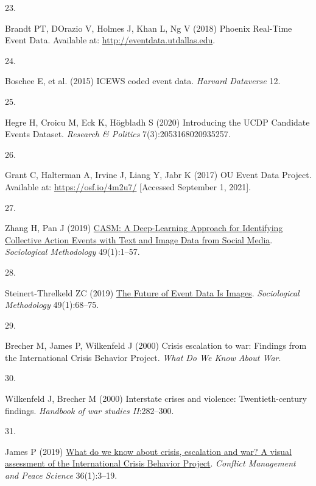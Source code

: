 \documentclass{article}
\newlength{\cslhangindent}
\newlength{\csllabelwidth}
\newlength{\cslentryspacingunit} %
\newenvironment{CSLReferences}[2] %
 {%
  \setlength{\parindent}{0pt}
  \ifodd #1
  \let\oldpar\par
  \def\par{\hangindent=\cslhangindent\oldpar}
  \fi
  \setlength{\parskip}{#2\cslentryspacingunit}
 }%
 {}
\newcommand{\CSLLeftMargin}[1]{\parbox[t]{\csllabelwidth}{#1}}
\newcommand{\CSLRightInline}[1]{\parbox[t]{\linewidth - \csllabelwidth}{#1}\break}
\begin{document}
\begin{CSLReferences}{0}{0}
\leavevmode{}%
\CSLLeftMargin{23. }%
\CSLRightInline{Brandt PT, DOrazio V, Holmes J, Khan L, Ng V (2018)
Phoenix {Real-Time Event Data}. Available at:
\url{http://eventdata.utdallas.edu}.}

\leavevmode{}%
\CSLLeftMargin{24. }%
\CSLRightInline{Boschee E, et al. (2015) {ICEWS} coded event data.
\emph{Harvard Dataverse} 12.}

\leavevmode{}%
\CSLLeftMargin{25. }%
\CSLRightInline{Hegre H, Croicu M, Eck K, Högbladh S (2020) Introducing
the {UCDP Candidate Events Dataset}. \emph{Research \& Politics}
7(3):2053168020935257.}

\leavevmode{}%
\CSLLeftMargin{26. }%
\CSLRightInline{Grant C, Halterman A, Irvine J, Liang Y, Jabr K (2017)
{OU Event Data Project}. Available at: \url{https://osf.io/4m2u7/}
{[}Accessed September 1, 2021{]}.}

\leavevmode{}%
\CSLLeftMargin{27. }%
\CSLRightInline{Zhang H, Pan J (2019)
\href{https://doi.org/10.1177/0081175019860244}{{CASM}: {A Deep-Learning
Approach} for {Identifying Collective Action Events} with {Text} and
{Image Data} from {Social Media}}. \emph{Sociological Methodology}
49(1):1--57.}

\leavevmode{}%
\CSLLeftMargin{28. }%
\CSLRightInline{Steinert-Threlkeld ZC (2019)
\href{https://doi.org/10.1177/0081175019860238}{The {Future} of {Event
Data Is Images}}. \emph{Sociological Methodology} 49(1):68--75.}

\leavevmode{}%
\CSLLeftMargin{29. }%
\CSLRightInline{Brecher M, James P, Wilkenfeld J (2000) Crisis
escalation to war: {Findings} from the {International Crisis Behavior
Project}. \emph{What Do We Know About War}.}

\leavevmode{}%
\CSLLeftMargin{30. }%
\CSLRightInline{Wilkenfeld J, Brecher M (2000) Interstate crises and
violence: Twentieth-century findings. \emph{Handbook of war studies
II}:282--300.}

\leavevmode{}%
\CSLLeftMargin{31. }%
\CSLRightInline{James P (2019)
\href{https://doi.org/10.1177/0738894218793135}{What do we know about
crisis, escalation and war? {A} visual assessment of the {International
Crisis Behavior Project}}. \emph{Conflict Management and Peace Science}
36(1):3--19.}


\end{CSLReferences}
\end{document}
